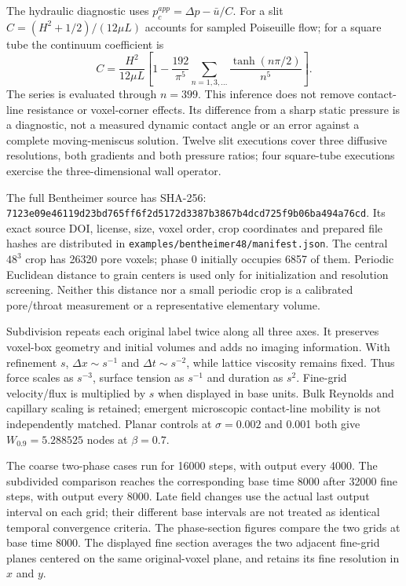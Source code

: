 \documentclass[11pt]{article}
\begin{document}
The hydraulic diagnostic uses $p_c^{app}=\Delta p-\bar u/C$.
For a slit $C=(H^2+1/2)/(12\mu L)$ accounts for sampled Poiseuille flow;
for a square tube the continuum coefficient is
\begin{equation}
 C=\frac{H^2}{12\mu L}
 \left[1-\frac{192}{\pi^5}\sum_{n=1,3,\ldots}
 \frac{\tanh(n\pi/2)}{n^5}\right].
\end{equation}
The series is evaluated through $n=399$. This inference does not remove
contact-line resistance or voxel-corner effects. Its difference from a sharp
static pressure is a diagnostic, not a measured dynamic contact angle or
an error against a complete moving-meniscus solution. Twelve slit executions
cover three diffusive resolutions, both gradients and both pressure ratios;
four square-tube executions exercise the three-dimensional wall operator.

The full Bentheimer source has SHA-256:\\
\texttt{7123e09e46119d23bd765ff6f2d5172d3387b3867b4dcd725f9b06ba494a76cd}.
Its exact source DOI, license, size, voxel order, crop coordinates and prepared
file hashes are distributed in \texttt{examples/bentheimer48/manifest.json}.
The central $48^3$ crop has 26320 pore voxels; phase 0 initially occupies
6857 of them. Periodic Euclidean distance to grain centers is used only for
initialization and resolution screening. Neither this distance nor a small
periodic crop is a calibrated pore/throat measurement or a representative
elementary volume.

Subdivision repeats each original label twice along all three axes. It
preserves voxel-box geometry and initial volumes and adds no imaging information.
With refinement $s$, $\Delta x\sim s^{-1}$ and $\Delta t\sim s^{-2}$,
while lattice viscosity remains fixed. Thus force scales as $s^{-3}$,
surface tension as $s^{-1}$ and duration as $s^2$. Fine-grid velocity/flux
is multiplied by $s$ when displayed in base units. Bulk Reynolds and capillary
scaling is retained; emergent microscopic contact-line mobility is not
independently matched. Planar controls at $\sigma=0.002$ and 0.001 both give
$W_{0.9}=5.288525$ nodes at $\beta=0.7$.

The coarse two-phase cases run for 16000 steps, with output every 4000.
The subdivided comparison reaches the corresponding base time 8000 after
32000 fine steps, with output every 8000. Late field changes use the actual
last output interval on each grid; their different base intervals are not
treated as identical temporal convergence criteria. The phase-section figures
compare the two grids at base time 8000. The displayed fine section averages
the two adjacent fine-grid planes centered on the same original-voxel plane,
and retains its fine resolution in $x$ and $y$.
\end{document}
